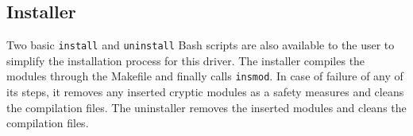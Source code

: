 \subsection{Installer}
Two basic \texttt{install} and \texttt{uninstall} Bash scripts are also available to the user to simplify the installation process for this driver. The installer compiles the modules through the Makefile and finally calls \texttt{insmod}. In case of failure of any of its steps, it removes any inserted cryptic modules as a safety measures and cleans the compilation files. The uninstaller removes the inserted modules and cleans the compilation files. 
